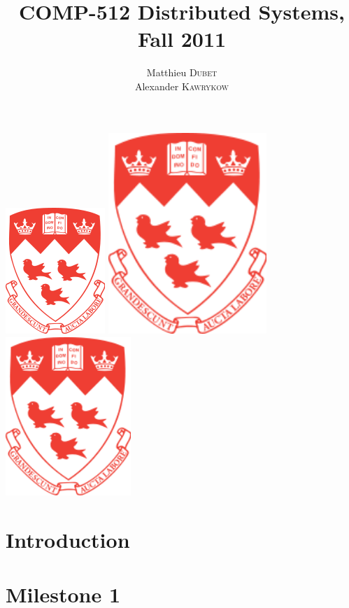 \documentclass[a4paper]{article}
\title{COMP-512 Distributed Systems, Fall 2011}
\author{
Matthieu \textsc{Dubet} \\
Alexander \textsc{Kawrykow} \\
}
\begin{document}
\maketitle
\includegraphics{mcgill_logo.png}
\includegraphics[width=60mm]{mcgill_logo.png}
\includegraphics[height=60mm]{mcgill_logo.png}

\clearpage
\tableofcontents
\clearpage
\section{Introduction}
\section{Milestone 1}

%
%
\end{document}
